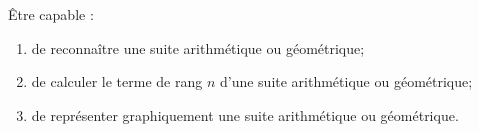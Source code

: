 \begin{myobj}
	Être capable : 
\begin{enumerate}
	\item de reconnaître une suite arithmétique ou géométrique;
	\item de calculer le terme de rang $n$ d'une suite arithmétique ou géométrique;
	\item de représenter graphiquement une suite arithmétique ou géométrique.
\end{enumerate}
\end{myobj}